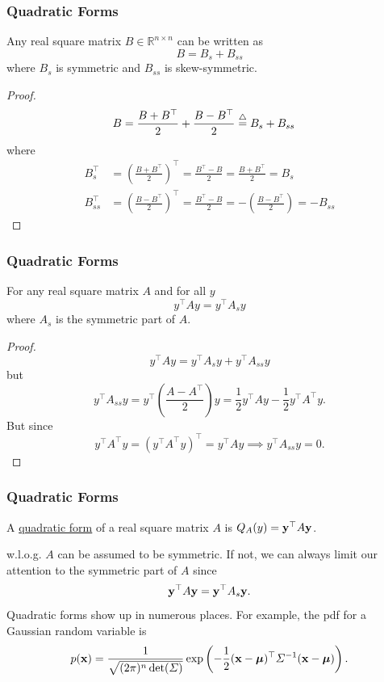 \documentclass{beamer}
\begin{document}
\begin{frame}\frametitle{Quadratic Forms}
	\begin{lemma}
		Any real square matrix $B\in\mathbb{R}^{n\times n}$ can be written as
		\[ 
			B = B_s + B_{ss} 
		\]
		where $B_s$ is symmetric and $B_{ss}$ is skew-symmetric.
	\end{lemma}
	
	\begin{proof}
		\begin{align*}
			B &= \frac{B + B^\top }{2} + \frac{B - B^\top }{2} 
			  \stackrel{\triangle}{=}  B_s + B_{ss} 
		\end{align*}
		where
		\begin{align*}
			B_s^\top  &= \left(\frac{B + B^\top }{2}\right)^\top  
			      = \frac{B^\top  - B}{2} = \frac{B + B^\top }{2} 
			      = B_s \\
			B_{ss}^\top  &= \left(\frac{B-B^\top }{2}\right)^\top  
			         = \frac{B^\top -B}{2} 
			          = -\left(\frac{B-B^\top }{2}\right) 
			         = -B_{ss} 
		\end{align*}
	\end{proof}
\end{frame}

\begin{frame}\frametitle{Quadratic Forms}
	\begin{lemma}
		For any real square matrix $A$ and for all $y$
		\[ 
			y^\top Ay = y^\top A_sy 
		\]
		where $A_s$ is the symmetric part of $A$.
	\end{lemma}
	
	\begin{proof}
	\[ 
		y^\top Ay = y^\top A_sy + y^\top A_{ss}y 
	\]
	but
	\[
		y^\top A_{ss}y = y^\top \left(\frac{A-A^\top }{2}\right)y 
		           = \frac{1}{2}y^\top Ay - \frac{1}{2}y^\top A^\top y.
	\]
	But since
	\[
		y^\top A^\top y = (y^\top A^\top y)^\top  
		        = y^\top Ay 
		        \implies y^\top A_{ss}y = 0.
	\]		
	\end{proof}
\end{frame}

\begin{frame}\frametitle{Quadratic Forms}
	\begin{definition}
		A \underline{quadratic form} of a real square matrix $A$ is $Q_A(y) = \mathbf{y}^\top A \mathbf{y}$.		
	\end{definition}
	
	w.l.o.g. $A$ can be assumed to be symmetric.  If not, we can always limit our attention to the symmetric part of $A$ since
	\[ 
		\mathbf{y}^\top A \mathbf{y} = \mathbf{y}^\top A_s \mathbf{y}. 
	\]
	Quadratic forms show up in numerous places.	For example, the pdf for a Gaussian random variable is 
	\[
	p(\mathbf{x}) = \frac{1}{\sqrt{(2\pi)^n\det(\Sigma)}}\exp\left(-\frac{1}{2}(\mathbf{x}-\boldsymbol{\mu})^\top \Sigma^{-1} (\mathbf{x}-\boldsymbol{\mu})\right).
	\]	
\end{frame}
\end{document}
